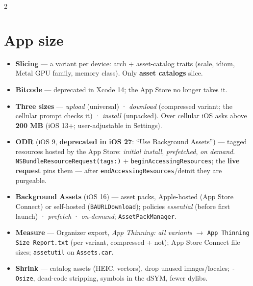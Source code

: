 \documentclass[8pt]{extarticle}
\begin{document}
\begin{multicols}{2}
\raggedright

\section{App size}
\begin{itemize}
  \item \textbf{Slicing} — a variant per device: arch + asset-catalog traits (scale,
        idiom, Metal GPU family, memory class). Only \textbf{asset catalogs} slice.
  \item \textbf{Bitcode} — deprecated in Xcode 14; the App Store no longer takes it.
  \item \textbf{Three sizes} — \emph{upload} (universal) · \emph{download} (compressed
        variant; the cellular prompt checks it) · \emph{install} (unpacked). Over cellular
        iOS asks above \textbf{200 MB} (iOS 13+; user-adjustable in Settings).
  \item \textbf{ODR} (iOS 9, \textbf{deprecated in iOS 27}: ``Use Background Assets'') —
        tagged resources hosted by the App Store: \emph{initial install},
        \emph{prefetched}, \emph{on demand}. \texttt{NSBundleResourceRequest(tags:)} +
        \texttt{beginAccessingResources}; the \textbf{live request} pins them — after
        \texttt{endAccessingResources}/deinit they are purgeable.
  \item \textbf{Background Assets} (iOS 16) — asset packs, Apple-hosted (App Store
        Connect) or self-hosted (\texttt{BAURLDownload}); policies \emph{essential}
        (before first launch) · \emph{prefetch} · \emph{on-demand}; \texttt{AssetPackManager}.
  \item \textbf{Measure} — Organizer export, \emph{App Thinning: all variants} $\to$
        \texttt{App Thinning Size Report.txt} (per variant, compressed + not); App Store
        Connect file sizes; \texttt{assetutil} on \texttt{Assets.car}.
  \item \textbf{Shrink} — catalog assets (HEIC, vectors), drop unused images/locales;
        \texttt{-Osize}, dead-code stripping, symbols in the dSYM, fewer dylibs.
\end{itemize}


\end{multicols}
\end{document}
